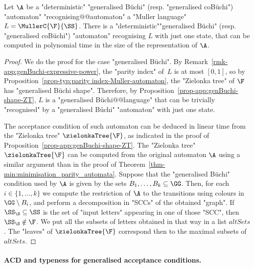 \documentclass{theoretics}
\begin{document}
\begin{corollary}
	Let $\A$ %
	be a "deterministic" "generalised Büchi" (resp. "generalised coB\"uchi") "automaton"  "recognising@@automaton" a "Muller language" $L = \MullerC{\F}{\SS}$. There is a "deterministic""generalised Büchi" (resp. "generalised coB\"uchi") "automaton" recognising $L$ with just one state, that can be computed in polynomial time in the size of the representation of $\A$.
\end{corollary}
\begin{proof}
	We do the proof for the case "generalised Büchi".
	By Remark~\ref{rmk-app:genBuchi-expressive-power}, the "parity index" of~$L$ is at most $[0,1]$, so by Proposition~\ref{prop-typ:parity index-Muller-automaton}, the "Zielonka tree" of $\F$ has "generalised B\"uchi shape". Therefore, by Proposition~\ref{prop-app:genBuchi-shape-ZT}, $L$ is a "generalised B\"uchi@@language" that can be trivially "recognised" by a "generalised B\"uchi" "automaton" with just one state.
	
	The acceptance condition of such automaton can be deduced in linear time from the "Zielonka tree" $\zielonkaTree{\F}$, as indicated in the proof of Proposition~\ref{prop-app:genBuchi-shape-ZT}. The "Zielonka tree" $\zielonkaTree{\F}$ can be computed from the original automaton $\A$ using a similar argument than in the proof of Theorem~\ref{thm-min:minimisation_parity_automata}. Suppose that the "generalised Büchi" condition used by $\A$ is given by the sets $B_1,\dots, B_k\subseteq \GG$. Then, for each $i\in \{1,\dots,k\}$ we compute the restriction of $\A$ to the transitions using colours in $\GG\setminus B_i$, and perform a decomposition in "SCCs" of the obtained "graph". If $\SS_\S\subseteq \SS$ is the set of "input letters" appearing in one of those "SCC", then $\SS_\S\notin \F$. We put all the subsets of letters obtained in that way in a list $\mathit{altSets}$. The "leaves" of $\zielonkaTree{\F}$ correspond then to the maximal subsets of $\mathit{altSets}$.	
\end{proof}

\paragraph*{ACD and typeness for generalised acceptance conditions.}
\end{document}
